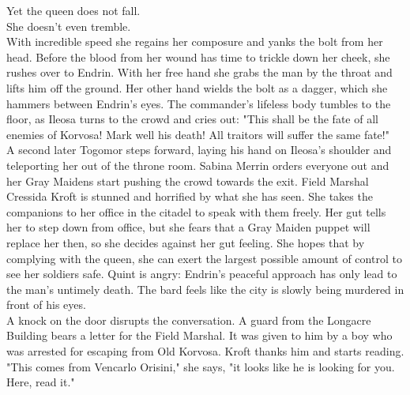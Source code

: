 Yet the queen does not fall.\\

She doesn't even tremble.\\

With incredible speed she regains her composure and yanks the bolt from her head. Before the blood from her wound has time to trickle down her cheek, she rushes over to Endrin. With her free hand she grabs the man by the throat and lifts him off the ground. Her other hand wields the bolt as a dagger, which she hammers between Endrin's eyes. The commander's lifeless body tumbles to the floor, as Ileosa turns to the crowd and cries out: "This shall be the fate of all enemies of Korvosa! Mark well his death! All traitors will suffer the same fate!"\\

A second later Togomor steps forward, laying his hand on Ileosa's shoulder and teleporting her out of the throne room. Sabina Merrin orders everyone out and her Gray Maidens start pushing the crowd towards the exit. Field Marshal Cressida Kroft is stunned and horrified by what she has seen. She takes the companions to her office in the citadel to speak with them freely. Her gut tells her to step down from office, but she fears that a Gray Maiden puppet will replace her then, so she decides against her gut feeling. She hopes that by complying with the queen, she can exert the largest possible amount of control to see her soldiers safe. Quint is angry: Endrin's peaceful approach has only lead to the man's untimely death. The bard feels like the city is slowly being murdered in front of his eyes.\\

A knock on the door disrupts the conversation. A guard from the Longacre Building bears a letter for the Field Marshal. It was given to him by a boy who was arrested for escaping from Old Korvosa. Kroft thanks him and starts reading. "This comes from Vencarlo Orisini," she says, "it looks like he is looking for you. Here, read it."\\

